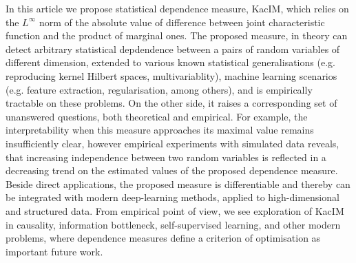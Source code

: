 \documentclass{article}
\begin{document}
\label{section:conclusion}
In this article we propose statistical dependence measure, KacIM, which relies on the $L^{\infty}$ norm of the absolute value of difference between joint characteristic function and the product of marginal ones. The proposed measure, in theory can detect arbitrary statistical depdendence between a pairs of random variables of different dimension, extended to various known statistical generalisations (e.g. reproducing kernel Hilbert spaces, multivariablity), machine learning scenarios (e.g. feature extraction, regularisation, among others), and is empirically tractable on these problems. On the other side, it raises a corresponding set of unanswered questions, both theoretical and empirical. For example, the interpretability when this measure approaches its maximal value remains insufficiently clear, however empirical experiments with simulated data reveals, that increasing independence between two random variables is reflected in a decreasing trend on the estimated values of the proposed dependence measure. Beside direct applications, the proposed measure is differentiable and thereby can be integrated with modern deep-learning methods, applied to high-dimensional and structured data. From empirical point of view, we see exploration of KacIM in causality, information bottleneck, self-supervised learning, and other modern problems, where dependence measures define a criterion of optimisation as important future work.

\end{document}
